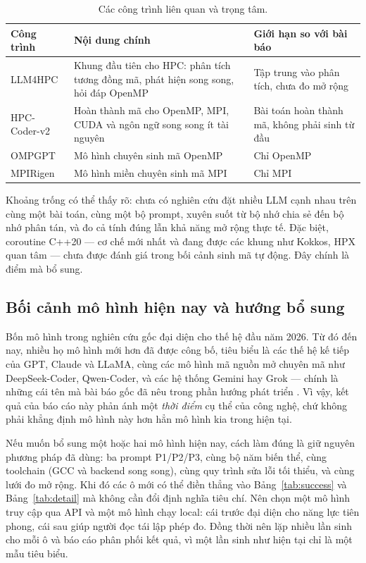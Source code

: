 \begin{table}[H]
\centering
\small
\caption{Các công trình liên quan và trọng tâm.}
\label{tab:related}
\begin{tabularx}{\textwidth}{@{}p{3.0cm} X p{3.4cm}@{}}
\toprule
\textbf{Công trình} & \textbf{Nội dung chính} & \textbf{Giới hạn so với bài báo} \\
\midrule
LLM4HPC \cite{chen2023llm4hpc} & Khung đầu tiên cho HPC: phân tích tương đồng mã, phát hiện song song, hỏi đáp OpenMP & Tập trung vào phân tích, chưa đo mở rộng \\
HPC-Coder-v2 \cite{chaturvedi2025hpccoderv2} & Hoàn thành mã cho OpenMP, MPI, CUDA và ngôn ngữ song song ít tài nguyên & Bài toán hoàn thành mã, không phải sinh từ đầu \\
OMPGPT \cite{chen2024ompgpt} & Mô hình chuyên sinh mã OpenMP & Chỉ OpenMP \\
MPIRigen \cite{schneider2024mpirigen} & Mô hình miền chuyên sinh mã MPI & Chỉ MPI \\
\bottomrule
\end{tabularx}
\end{table}

Khoảng trống có thể thấy rõ: chưa có nghiên cứu đặt nhiều LLM cạnh nhau trên
cùng một bài toán, cùng một bộ prompt, xuyên suốt từ bộ nhớ chia sẻ đến bộ nhớ
phân tán, và đo cả tính đúng lẫn khả năng mở rộng thực tế. Đặc biệt, coroutine
C++20 — cơ chế mới nhất và đang được các khung như Kokkos, HPX quan tâm — chưa
được đánh giá trong bối cảnh sinh mã tự động. Đây chính là điểm mà
\cite{diehl2026} bổ sung.

\subsection{Bối cảnh mô hình hiện nay và hướng bổ sung}\label{subsec:mo-hinh-hien-nay}

Bốn mô hình trong nghiên cứu gốc đại diện cho thế hệ đầu năm 2026. Từ đó đến
nay, nhiều họ mô hình mới hơn đã được công bố, tiêu biểu là các thế hệ kế tiếp
của GPT, Claude và LLaMA, cùng các mô hình mã nguồn mở chuyên mã như
DeepSeek-Coder, Qwen-Coder, và các hệ thống Gemini hay Grok — chính là những cái
tên mà bài báo gốc đã nêu trong phần hướng phát triển \cite{diehl2026}. Vì vậy,
kết quả của báo cáo này phản ánh một \emph{thời điểm} cụ thể của công nghệ, chứ
không phải khẳng định mô hình này hơn hẳn mô hình kia trong hiện tại.

Nếu muốn bổ sung một hoặc hai mô hình hiện nay, cách làm đúng là giữ nguyên
phương pháp đã dùng: ba prompt P1/P2/P3, cùng bộ năm biến thể, cùng toolchain
(GCC và backend song song), cùng quy trình sửa lỗi tối thiểu, và cùng lưới đo
mở rộng. Khi đó các ô mới có thể điền thẳng vào Bảng~\ref{tab:success} và
Bảng~\ref{tab:detail} mà không cần đổi định nghĩa tiêu chí. Nên chọn một mô hình
 truy cập qua API và một mô hình  chạy local:
cái trước đại diện cho năng lực tiên phong, cái sau giúp người đọc tái lập phép
đo. Đồng thời nên lặp nhiều lần sinh cho mỗi ô và báo cáo phân phối kết quả,
vì một lần sinh như hiện tại chỉ là một mẫu tiêu biểu.

